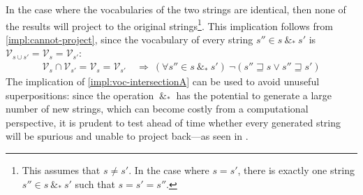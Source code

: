 \documentclass[a4paper,12pt,leqno]{article}
\newcommand{\spasync}{~\&_*~}
\newcommand{\V}{\mathcal{V}}
\begin{document}
In the case where the vocabularies of the two strings are identical, then none of the results will project to the original strings\footnote{This assumes that $s \neq s'$. In the case where $s = s'$, there is exactly one string $s'' \in s \spasync s'$ such that $s = s' = s''$.}. This implication follows from \cref{impl:cannot-project}, since the vocabulary of every string $s'' \in s \spasync s'$ is $\V_{s \cup s'} = \V_s = \V_{s'}$:
\begin{align}
	\V_s \cap \V_{s'} = \V_s = \V_{s'} &~\Longrightarrow~ (\forall s'' \in s \spasync s')~\lnot (s'' \sqsupseteq s \lor s'' \sqsupseteq s')\label{impl:voc-intersectionA}
\end{align}
The implication of \cref{impl:voc-intersectionA} can be used to avoid unuseful superpositions: since the operation $\spasync$ has the potential to generate a large number of new strings, which can become costly from a computational perspective, it is prudent to test ahead of time whether every generated string will be spurious and unable to project back---as seen in .
\end{document}
